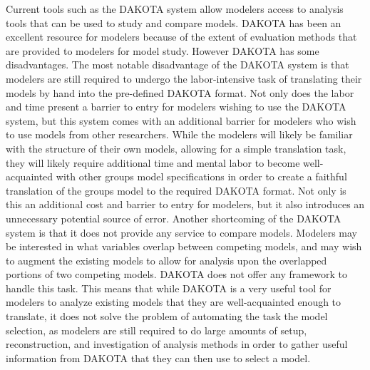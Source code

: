 Current tools such as the DAKOTA system allow modelers access to analysis tools that can be used to study and compare models. DAKOTA has been an excellent resource for modelers because of the extent of evaluation methods that are provided to modelers for model study. However DAKOTA has some disadvantages. The most notable disadvantage of the DAKOTA system is that modelers are still required to undergo the labor-intensive task of translating their models by hand into the pre-defined DAKOTA format. Not only does the labor and time present a barrier to entry for modelers wishing to use the DAKOTA system, but this system comes with an additional barrier for modelers who wish to use models from other researchers. While the modelers will likely be familiar with the structure of their own models, allowing for a simple translation task, they will likely require additional time and mental labor to become well-acquainted with other groups model specifications in order to create a faithful translation of the groups model to the required DAKOTA format. Not only is this an additional cost and barrier to entry for modelers, but it also introduces an unnecessary potential source of error. Another shortcoming of the DAKOTA system is that it does not provide any service to compare models. Modelers may be interested in what variables overlap between competing models, and may wish to augment the existing models to allow for analysis upon the overlapped portions of two competing models. DAKOTA does not offer any framework to handle this task. This means that while DAKOTA is a very useful tool for modelers to analyze existing models that they are well-acquainted enough to translate, it does not solve the problem of automating the task the model selection, as modelers are still required to do large amounts of setup, reconstruction, and investigation of analysis methods in order to gather useful information from DAKOTA that they can then use to select a model.


